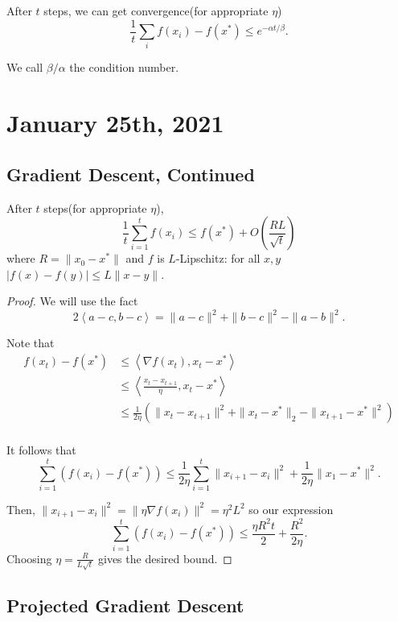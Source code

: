 \documentclass[12pt]{scrartcl}
\newcommand{\<}{\langle}
\renewcommand{\>}{\rangle}
\let \grad \nabla
\begin{document}
\begin{thm} After $t$ steps, we can get convergence(for appropriate $\eta$)
$$\frac{1}{t}\sum_i f(x_i) - f(x^*) \le e^{-\alpha t/\beta}.$$

We call $\beta/\alpha$ the condition number.  
\end{thm}
\pagebreak
\section{January 25th, 2021}
\subsection{Gradient Descent, Continued}
\begin{thm} After $t$ steps(for appropriate $\eta$), 
$$\frac{1}{t} \sum_{i=1}^t f(x_i) \le f(x^*) + O(\frac{RL}{\sqrt{t}})$$
where $R = \|x_0 - x^* \|$ and $f$ is $L$-Lipschitz: for all $x, y$ $|f(x) - f(y)| \le L \|x - y\|$.
\end{thm}
\begin{proof}
We will use the fact
$$2\left <a-c, b-c\right > = \|a-c\|^2 + \|b - c\|^2 - \|a - b\|^2.$$

Note that 
\begin{align*}
f(x_t) - f(x^*) &\le \left<\grad f(x_t), x_t - x^*\right> \\
&\le \left< \frac{x_t - x_{t+1}}{\eta}, x_t - x^*\right> \\
&\le \frac{1}{2\eta} \left (\|x_t - x_{t+1}\|^2 + \|x_t - x^*\|_2 - \|x_{t+1} - x^*\|^2\right ) \\
\end{align*}

It follows that $$\sum_{i=1}^t (f(x_i) - f(x^*)) \le \frac{1}{2\eta} \sum_{i=1}^t \|x_{i+1} - x_i\|^2 + \frac{1}{2\eta} \|x_1 - x^*\|^2.$$

Then, $\|x_{i+1} - x_i\|^2 = \|\eta \grad f(x_i)\|^2 = \eta^2 L^2$ so our expression
$$\sum_{i=1}^t (f(x_i) - f(x^*)) \le \frac{\eta R^2t}{2} + \frac{R^2}{2\eta}.$$
Choosing $\eta = \frac{R}{L\sqrt{t}}$ gives the desired bound.  
\end{proof}

\subsection{Projected Gradient Descent}
\end{document}
